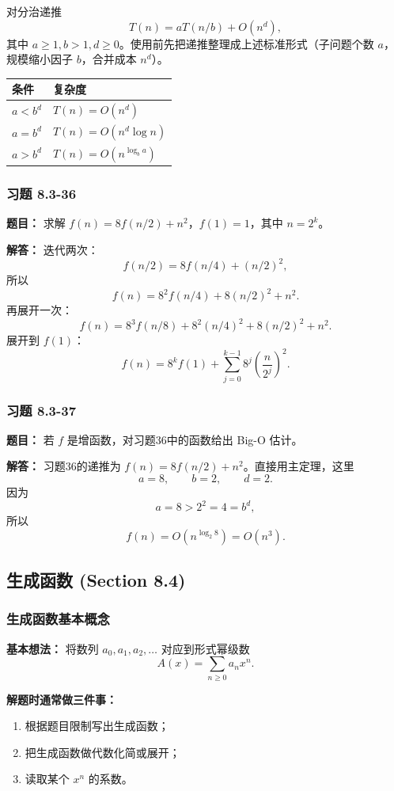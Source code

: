 \documentclass[11pt,UTF8]{article}
\begin{document}
对分治递推
\[ T(n)=aT(n/b)+O(n^d), \]
其中 $a\ge 1,b>1,d\ge 0$。使用前先把递推整理成上述标准形式（子问题个数 $a$，规模缩小因子 $b$，合并成本 $n^d$）。

\begin{center}
\begin{tabular}{l|l}
\hline
条件 & 复杂度 \\
\hline
$a<b^d$ & $T(n)=O(n^d)$ \\
$a=b^d$ & $T(n)=O(n^d\log n)$ \\
$a>b^d$ & $T(n)=O(n^{\log_b a})$ \\
\hline
\end{tabular}
\end{center}

\subsubsection*{习题 8.3-36}
\textbf{题目：} 求解 $f(n)=8f(n/2)+n^2$，$f(1)=1$，其中 $n=2^k$。

\textbf{解答：} 迭代两次：
\[ f(n/2)=8f(n/4)+(n/2)^2, \]
所以
\[ f(n)=8^2f(n/4)+8(n/2)^2+n^2. \]
再展开一次：
\[ f(n)=8^3f(n/8)+8^2(n/4)^2+8(n/2)^2+n^2. \]
展开到 $f(1)$：
\[ f(n)=8^kf(1)+\sum_{j=0}^{k-1}8^j\left(\frac{n}{2^j}\right)^2. \]

\subsubsection*{习题 8.3-37}
\textbf{题目：} 若 $f$ 是增函数，对习题36中的函数给出 Big-O 估计。

\textbf{解答：} 习题36的递推为 $f(n)=8f(n/2)+n^2$。直接用主定理，这里
\[ a=8,\qquad b=2,\qquad d=2. \]
因为
\[ a=8>2^2=4=b^d, \]
所以
\[ \boxed{f(n)=O(n^{\log_2 8})=O(n^3).} \]

\subsection{生成函数 (Section 8.4)}

\subsubsection*{生成函数基本概念}

\textbf{基本想法：} 将数列 $a_0,a_1,a_2,\ldots$ 对应到形式幂级数
\[ A(x)=\sum_{n\ge 0}a_nx^n. \]

\textbf{解题时通常做三件事：}
\begin{enumerate}
    \item 根据题目限制写出生成函数；
    \item 把生成函数做代数化简或展开；
    \item 读取某个 $x^n$ 的系数。
\end{enumerate}
\end{document}
